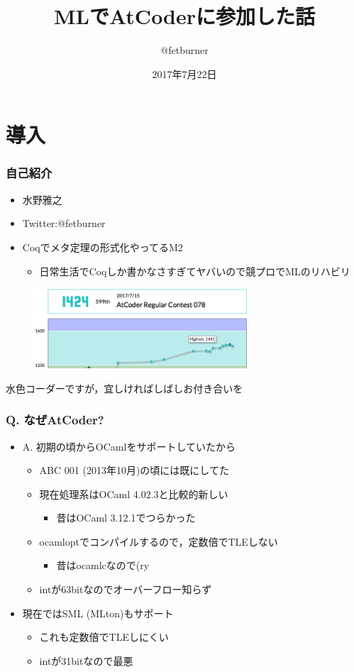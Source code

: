 \documentclass[dvipdfmx,cjk,xcolor=dvipsnames,envcountsect,notheorems,12pt]{beamer}
\title{MLでAtCoderに参加した話}
\author{@fetburner}
\date{2017年7月22日}
\theoremstyle{definition}
\begin{document}
\frame[plain]{\titlepage}%

\section*{導入}

\begin{frame}
	\frametitle{自己紹介}
	\begin{itemize}
		\item 水野雅之
		\item Twitter:@fetburner
		\item Coqでメタ定理の形式化やってるM2
			\begin{itemize}
				\item 日常生活でCoqしか書かなさすぎてヤバいので競プロでMLのリハビリ
			\end{itemize}
	\end{itemize}
	\begin{figure}[hb]
		\includegraphics[width=80mm]{./Rating.png}
	\end{figure}
	\begin{center}
		水色コーダーですが，宜しければしばしお付き合いを
	\end{center}
\end{frame}

\begin{frame}
	\frametitle{Q. なぜAtCoder?}
	\begin{itemize}
		\item A. 初期の頃からOCamlをサポートしていたから
			\begin{itemize}
				\item ABC 001 (2013年10月)の頃には既にしてた
				\item 現在処理系はOCaml 4.02.3と比較的新しい
					\begin{itemize}
						\item 昔はOCaml 3.12.1でつらかった
					\end{itemize}
				\item ocamloptでコンパイルするので，定数倍でTLEしない
					\begin{itemize}
						\item 昔はocamlcなので(ry
					\end{itemize}
				\item intが63bitなのでオーバーフロー知らず
			\end{itemize}
		\item 現在ではSML (MLton)もサポート
			\begin{itemize}
				\item これも定数倍でTLEしにくい
				\item intが31bitなので最悪
			\end{itemize}
	\end{itemize}
\end{frame}
\end{document}
